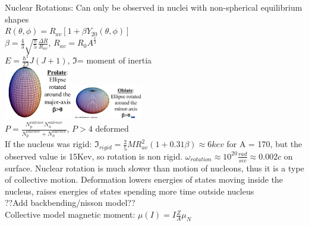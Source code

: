 \documentclass{article}
\begin{document}
\begin{multicols}{3}
Nuclear Rotations:  Can only be observed in nuclei with non-spherical equilibrium shapes\\
$R(\theta,\phi) = R_{av}[1+\beta Y_{20}(\theta,\phi)]$\\
$\beta = \frac{4}{3} \sqrt{\frac{\pi}{5}} \frac{\Delta R}{R_{av}}$, $R_{av} = R_{0}A^{\frac{1}{3}}$\\
$E = \frac{\hbar^{2}}{2\Im}J(J+1)$, $\Im$= moment of inertia\\
\includegraphics[width=3cm]{images/prolate.png}
\includegraphics[width=3cm]{images/oblate.png}\\
$P = \frac{N_{p}^{valence}N_{n}^{valence}}{N_{p}^{valence}+N_{n}^{valence}}$, $P>4$ deformed\\
If the nucleus was rigid: $\Im_{rigid} = \frac{2}{5}MR_{av}^{2}(1+0.31\beta) \approx 6 kev$ for A = 170, but the observed value is 15Kev, so rotation is non rigid.  $\omega_{rotation} \approx 10^{20} \frac{rad}{sec} \approx 0.002c$ on surface.  Nuclear rotation is much slower than motion of nucleons, thus it is a type of collective motion. Deformation lowers energies of states moving inside the nucleus, raises energies of states spending more time outside nucleus\\??Add backbending/nisson model??\\
Collective model magnetic moment: 
$\mu (I) = I \frac{Z}{A} \mu_{N}$\\


\end{multicols}
\end{document}
